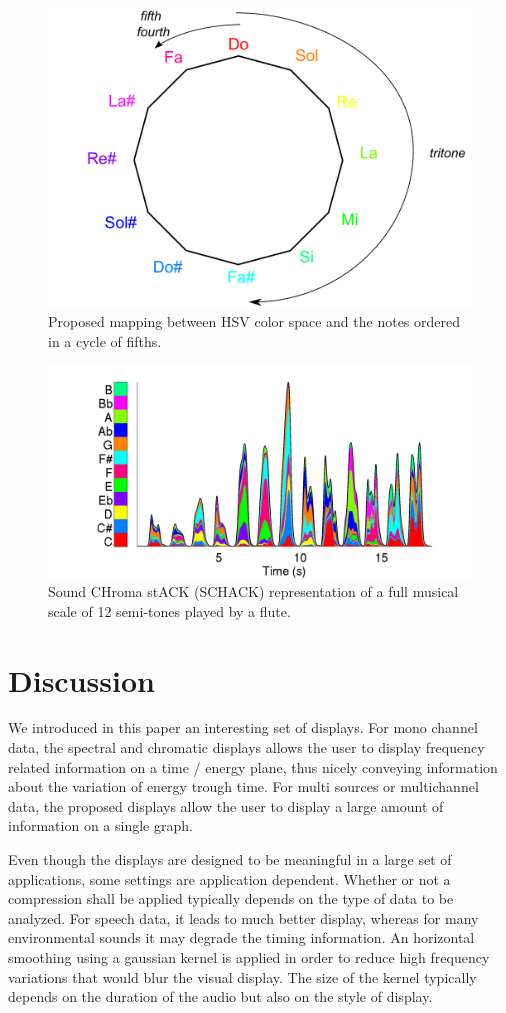 \documentclass{article}
\begin{document}
\begin{figure}[t]
\centering
\includegraphics[width=.5\textwidth]{cycleQuinte.pdf}
\caption{Proposed mapping between HSV color space and the notes ordered in a cycle of fifths.}
\label{fig:cycleQuinte}
\end{figure} 


\begin{figure}[t]
\centering
\includegraphics[width=.5\textwidth]{fluteGammeMonoNorm_schack}
\caption{Sound CHroma stACK (SCHACK) representation of a full musical scale of 12 semi-tones played by a flute.}
\label{fig:fluteGammeMonoNorm_schack}
\end{figure} 

\section{Discussion}\label{sec:discussion}

We introduced in this paper an interesting set of displays. For mono channel data, the spectral and chromatic displays allows the user to display frequency related information on a time / energy plane, thus nicely conveying information about the variation of energy trough time. For multi sources or multichannel data, the proposed displays allow the user to display a large amount of information on a single graph.

Even though the displays are designed to be meaningful in a large set of applications, some settings are application dependent. Whether or not a compression shall be applied typically depends on the type of data to be analyzed. For speech data, it leads to much better display, whereas for many environmental sounds it may degrade the timing information. An horizontal smoothing using a gaussian kernel is applied in order to reduce high frequency variations that would blur the visual display. The size of the kernel typically depends on the duration of the audio but also on the style of display. 
\end{document}
